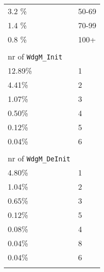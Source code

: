 \begin{longtable}{l l}
3.2 \% & 50-69\\
1.4 \% & 70-99\\
0.8 \% & 100+\\
\\

nr of \verb!WdgM_Init!\\
12.89\% & 1\\
4.41\% & 2\\
1.07\% & 3\\
0.50\% & 4\\
0.12\% & 5\\
0.04\% & 6\\\\

nr of \verb!WdgM_DeInit!\\
4.80\% & 1\\
1.04\% & 2\\
0.65\% & 3\\
0.12\% & 5\\
0.08\% & 4\\
0.04\% & 8\\
0.04\% & 6\\\\


\end{longtable}
